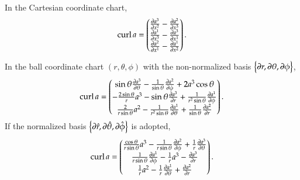 \documentclass[11pt, a4paper]{book}
\begin{document}
\begin{enumerate}
  In the Cartesian coordinate chart,
  \begin{equation}
    \label{eq:curl-expr-cartesian}
    \operatorname{curl} a = \begin{pmatrix}
      \frac{\partial a^3}{\partial x^2} - \frac{\partial a^2}{\partial x^3} \\
      \frac{\partial a^1}{\partial x^3} - \frac{\partial a^3}{\partial x^1} \\
      \frac{\partial a^2}{\partial x^1} - \frac{\partial a^1}{\partial x^2}
    \end{pmatrix}.
  \end{equation}
  
  In the ball coordinate chart $(r,\theta,\phi)$ with the non-normalized basis
  $\left\{ \boldsymbol{\partial}r, \boldsymbol{\partial}\theta, \boldsymbol{\partial}\phi \right\}$,
  \begin{equation}
    \label{eq:curl-expr-ball-coordinate-nonnormalized-basis}
    \operatorname{curl} a = \begin{pmatrix}
      \sin\theta \frac{\partial a^{3}}{\partial \theta} - \frac{1}{\sin\theta} \frac{\partial
        a^{2}}{\partial \phi} + 2a^3\cos\theta \\
      -\frac{2\sin\theta}{r}a^3 - \sin\theta \frac{\partial a^3}{\partial r} +
      \frac{1}{r^2\sin\theta}\frac{\partial a^1}{\partial \phi}\\
      \frac{2}{r\sin\theta}a^2 - \frac{1}{r^2\sin\theta}\frac{\partial a^1}{\partial \theta} +
      \frac{1}{\sin\theta}\frac{\partial a^{2}}{\partial r}
    \end{pmatrix}.
  \end{equation}
  If the normalized basis
  $\left\{ \boldsymbol{\partial}\hat{r}, \boldsymbol{\partial}\hat{\theta}, \boldsymbol{\partial}\hat{\phi}
  \right\}$ is adopted,
  \begin{equation}
    \label{eq:curl-expr-ball-coordinate-normalized-basis}
    \operatorname{curl} a = \begin{pmatrix}
      \frac{\cos\theta}{r\sin\theta} a^3 - \frac{1}{r\sin\theta} \frac{\partial
        a^{2}}{\partial \phi} + \frac{1}{r} \frac{\partial a^{3}}{\partial \theta} \\
      \frac{1}{r\sin\theta} \frac{\partial a^{1}}{\partial \phi} - \frac{1}{r}a^3 -
      \frac{\partial a^{3}}{\partial r} \\
      \frac{1}{r}a^2 - \frac{1}{r} \frac{\partial a^{1}}{\partial \theta} + \frac{\partial
        a^{2}}{\partial r}
    \end{pmatrix}.
  \end{equation}
  

\end{enumerate}
\end{document}
